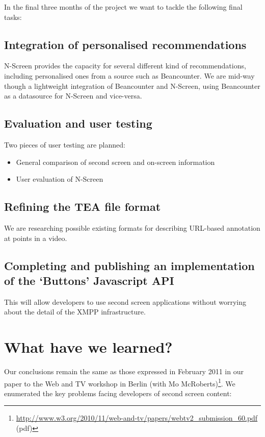 \documentclass{notube}
\begin{document}
In the final three months of the project we want to tackle the following final tasks:

\section{Integration of personalised recommendations}

N-Screen provides the capacity for several different kind of recommendations, including personalised ones from a source such as Beancounter. We are mid-way though a lightweight integration of Beancounter and N-Screen, using Beancounter as a datasource for N-Screen and vice-versa.

\section{Evaluation and user testing}

Two pieces of user testing are planned:

\begin{itemize}
\item{General comparison of second screen and on-screen information}
\item{User evaluation of N-Screen}
\end{itemize}

\section{Refining the TEA file format}

We are researching possible existing formats for describing URL-based annotation at points in a video.

\section{Completing and publishing an implementation of the `Buttons' Javascript API}

This will allow developers to use second screen applications without worrying about the detail of the XMPP infrastructure.


\chapter{What have we learned?}

Our conclusions remain the same as those expressed in February 2011 in our paper to the Web and TV workshop in Berlin (with Mo McRoberts)\footnote{\url{http://www.w3.org/2010/11/web-and-tv/papers/webtv2_submission_60.pdf} (pdf)}. We enumerated the key problems facing developers of second screen content:
\end{document}
